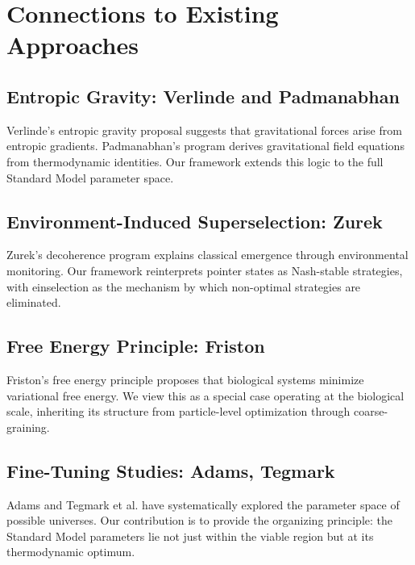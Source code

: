 \documentclass[12pt,a4paper]{article}
\theoremstyle{remark}
\begin{document}
\section{Connections to Existing Approaches}
\label{sec:connections}

\subsection{Entropic Gravity: Verlinde and Padmanabhan}

Verlinde's entropic gravity proposal \citep{Verlinde2011} suggests that gravitational forces arise from entropic gradients. Padmanabhan's program \citep{Padmanabhan2010} derives gravitational field equations from thermodynamic identities. Our framework extends this logic to the full Standard Model parameter space.

\subsection{Environment-Induced Superselection: Zurek}

Zurek's decoherence program \citep{Zurek2003} explains classical emergence through environmental monitoring. Our framework reinterprets pointer states as Nash-stable strategies, with einselection as the mechanism by which non-optimal strategies are eliminated.

\subsection{Free Energy Principle: Friston}

Friston's free energy principle \citep{Friston2010} proposes that biological systems minimize variational free energy. We view this as a special case operating at the biological scale, inheriting its structure from particle-level optimization through coarse-graining.

\subsection{Fine-Tuning Studies: Adams, Tegmark}

Adams \citep{Adams2019} and Tegmark et al. \citep{Tegmark2006} have systematically explored the parameter space of possible universes. Our contribution is to provide the organizing principle: the Standard Model parameters lie not just within the viable region but at its thermodynamic optimum.
\end{document}
